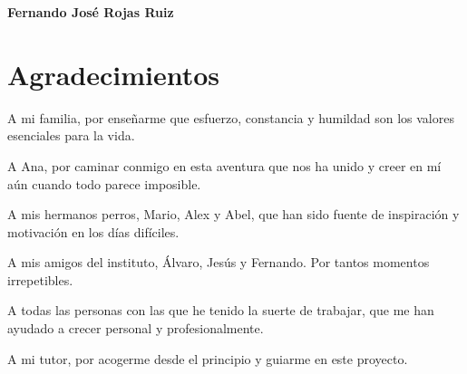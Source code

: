 \noindent \textbf{Fernando José Rojas Ruiz}

\chapter*{Agradecimientos}
\thispagestyle{empty}

       \vspace{1cm}

A mi familia, por enseñarme que esfuerzo, constancia y humildad son los valores esenciales para la vida.

\vspace{0.5cm}

A Ana, por caminar conmigo en esta aventura que nos ha unido y creer en mí aún cuando todo parece imposible.

\vspace{0.5cm}

A mis hermanos perros, Mario, Alex y Abel, que han sido fuente de inspiración y motivación en los días difíciles.

\vspace{0.5cm}

A mis amigos del instituto, Álvaro, Jesús y Fernando. Por tantos momentos irrepetibles.

\vspace{0.5cm}

A todas las personas con las que he tenido la suerte de trabajar, que me han ayudado a crecer personal y profesionalmente.

\vspace{0.5cm}

A mi tutor, por acogerme desde el principio y guiarme en este proyecto.
